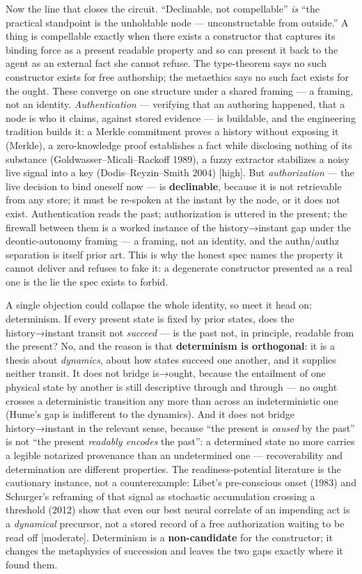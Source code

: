 \documentclass[11pt]{article}
\begin{document}
Now the line that closes the circuit. ``Declinable, not compellable'' \emph{is} ``the practical standpoint is the unholdable node — unconstructable from outside.'' A thing is compellable exactly when there exists a constructor that captures its binding force as a present readable property and so can present it back to the agent as an external fact she cannot refuse. The type-theorem says no such constructor exists for free authorship; the metaethics says no such fact exists for the ought. These converge on one structure under a shared framing — a framing, not an identity. \emph{Authentication} — verifying that an authoring happened, that a node is who it claims, against stored evidence — is buildable, and the engineering tradition builds it: a Merkle commitment proves a history without exposing it (Merkle), a zero-knowledge proof establishes a fact while disclosing nothing of its substance (Goldwasser–Micali–Rackoff 1989), a fuzzy extractor stabilizes a noisy live signal into a key (Dodis–Reyzin–Smith 2004) [high]. But \emph{authorization} — the live decision to bind oneself now — is \textbf{declinable}, because it is not retrievable from any store; it must be re-spoken at the instant by the node, or it does not exist. Authentication reads the past; authorization is uttered in the present; the firewall between them is a worked instance of the history→instant gap under the deontic-autonomy framing — a framing, not an identity, and the authn/\allowbreak{}authz separation is itself prior art. This is why the honest spec names the property it cannot deliver and refuses to fake it: a degenerate constructor presented as a real one is the lie the spec exists to forbid.

A single objection could collapse the whole identity, so meet it head on: determinism. If every present state is fixed by prior states, does the history→instant transit not \emph{succeed} — is the past not, in principle, readable from the present? No, and the reason is that \textbf{determinism is orthogonal}: it is a thesis about \emph{dynamics}, about how states succeed one another, and it supplies neither transit. It does not bridge is→ought, because the entailment of one physical state by another is still descriptive through and through — no ought crosses a deterministic transition any more than across an indeterministic one (Hume's gap is indifferent to the dynamics). And it does not bridge history→instant in the relevant sense, because ``the present is \emph{caused} by the past'' is not ``the present \emph{readably encodes} the past'': a determined state no more carries a legible notarized provenance than an undetermined one — recoverability and determination are different properties. The readiness-potential literature is the cautionary instance, not a counterexample: Libet's pre-conscious onset (1983) and Schurger's reframing of that signal as stochastic accumulation crossing a threshold (2012) show that even our best neural correlate of an impending act is a \emph{dynamical} precursor, not a stored record of a free authorization waiting to be read off [moderate]. Determinism is a \textbf{non-candidate} for the constructor; it changes the metaphysics of succession and leaves the two gaps exactly where it found them.
\end{document}
